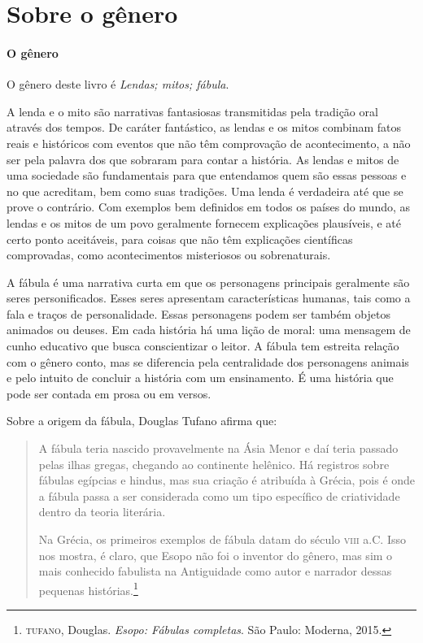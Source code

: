 \documentclass[11pt]{extarticle}
\begin{document}
\section{Sobre o gênero}

\paragraph{O gênero} O gênero deste livro é \textit{Lendas; mitos; fábula}. 

A lenda e o mito são narrativas fantasiosas transmitidas pela tradição oral através dos tempos. De caráter fantástico, as lendas e os mitos combinam fatos reais e históricos com eventos que não têm comprovação de acontecimento, a não ser pela palavra dos que sobraram para contar a história. As lendas e mitos de uma sociedade são fundamentais para que entendamos quem são essas pessoas e no que acreditam, bem como suas tradições. Uma lenda é verdadeira até que se prove o contrário. Com exemplos bem definidos em todos os países do mundo, as lendas e os mitos de um povo geralmente fornecem explicações plausíveis, e até certo ponto aceitáveis, para coisas que não têm explicações científicas comprovadas, como acontecimentos misteriosos ou sobrenaturais.

A fábula é uma narrativa curta em que os personagens principais geralmente são seres personificados. Esses seres apresentam características humanas, tais como a fala e traços de personalidade. Essas personagens podem ser também objetos animados ou deuses. Em cada história há uma lição de moral: uma mensagem de cunho educativo que busca conscientizar o leitor. A fábula tem estreita relação com o gênero conto, mas se diferencia pela centralidade dos personagens animais e pelo intuito de concluir a história com um ensinamento. É uma história que pode ser contada em prosa ou em versos. 

Sobre a origem da fábula, Douglas Tufano afirma que:

\begin{quote}
A fábula teria nascido provavelmente na Ásia Menor e daí teria passado pelas ilhas gregas, chegando ao continente helênico. Há registros sobre fábulas egípcias e hindus, mas sua criação é atribuída à Grécia, pois é onde a fábula passa a ser considerada como um tipo específico de criatividade dentro da teoria literária. 

Na Grécia, os primeiros exemplos de fábula datam do século \textsc{viii} a.C. Isso nos mostra, é claro, que Esopo não foi o inventor do gênero, mas sim o mais conhecido fabulista na Antiguidade como autor e narrador dessas pequenas histórias.\footnote{\textsc{tufano}, Douglas. \textit{Esopo: Fábulas completas}. São Paulo: Moderna, 2015.}
\end{quote}
\end{document}
